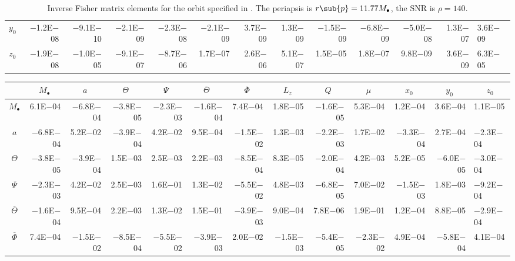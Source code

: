 \begin{sidewaystable}[htbp]
\begin{tabular}{crrrrrrrrrrr}
$y_0$ & $-$1.2E$-$08 & $-$9.1E$-$10 & $-$2.1E$-$09 & $-$2.3E$-$08 & $-$2.1E$-$09 & 3.7E$-$09 & 1.3E$-$09 & $-$1.5E$-$09 & $-$6.8E$-$09 & $-$5.0E$-$08 & 1.3E$-$07 & 3.6E$-$09 \\
$z_0$ & $-$1.9E$-$08 & $-$1.0E$-$05 & $-$9.1E$-$07 & $-$8.7E$-$06 & 1.7E$-$07 & 2.6E$-$06 & 5.1E$-$07 & 1.5E$-$05 & 1.8E$-$07 & 9.8E$-$09 & 3.6E$-$09 & 6.3E$-$05 \\
\bottomrule
\end{tabular}
\caption{Inverse Fisher matrix elements for the orbit specified in . The periapsis is $r\sub{p} = 11.77 M_\bullet$, the SNR is $\rho = 140$.}
\label{tab:Fisher_2}
\end{sidewaystable}
\begin{sidewaystable}[htbp]\squeezetable
\centering
\begin{tabular}{crrrrrrrrrrr}
\toprule
 &  &  &  &  &  &  &  &  &  &  &  &  \\ \midrule 
$M_\bullet$ & 6.1E$-$04 & $-$6.8E$-$04 & $-$3.8E$-$05 & $-$2.3E$-$03 & $-$1.6E$-$04 & 7.4E$-$04 & 1.8E$-$05 & $-$1.6E$-$05 & 5.3E$-$04 & 1.2E$-$04 & 3.6E$-$04 & 1.1E$-$05 \\
$a$ & $-$6.8E$-$04 & 5.2E$-$02 & $-$3.9E$-$04 & 4.2E$-$02 & 9.5E$-$04 & $-$1.5E$-$02 & 1.3E$-$03 & $-$2.2E$-$03 & 1.7E$-$02 & $-$3.3E$-$04 & 2.7E$-$04 & $-$2.3E$-$04 \\
$\Theta$ & $-$3.8E$-$05 & $-$3.9E$-$04 & 1.5E$-$03 & 2.5E$-$03 & 2.2E$-$03 & $-$8.5E$-$04 & 8.3E$-$05 & $-$2.0E$-$04 & 4.2E$-$03 & 5.2E$-$05 & $-$6.0E$-$05 & $-$3.0E$-$04 \\
$\Psi$ & $-$2.3E$-$03 & 4.2E$-$02 & 2.5E$-$03 & 1.6E$-$01 & 1.3E$-$02 & $-$5.5E$-$02 & 4.8E$-$03 & $-$6.8E$-$05 & 7.0E$-$02 & $-$1.5E$-$03 & 1.8E$-$03 & $-$9.2E$-$04 \\
$\overline{\Theta}$ & $-$1.6E$-$04 & 9.5E$-$04 & 2.2E$-$03 & 1.3E$-$02 & 1.5E$-$01 & $-$3.9E$-$03 & 9.0E$-$04 & 7.8E$-$06 & 1.9E$-$01 & 1.2E$-$04 & 8.8E$-$05 & $-$2.9E$-$04 \\
$\overline{\Phi}$ & 7.4E$-$04 & $-$1.5E$-$02 & $-$8.5E$-$04 & $-$5.5E$-$02 & $-$3.9E$-$03 & 2.0E$-$02 & $-$1.5E$-$03 & $-$5.4E$-$05 & $-$2.3E$-$02 & 4.9E$-$04 & $-$5.8E$-$04 & 4.1E$-$04 \\

\end{tabular}
\end{sidewaystable}

